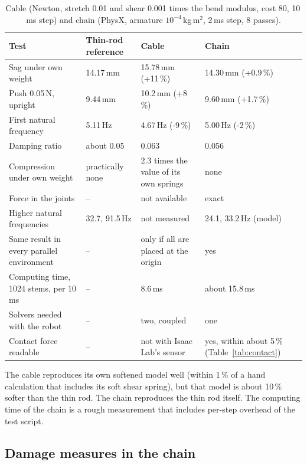 \begin{table}[h]
  \centering
  \caption{Cable (Newton, stretch 0.01 and shear 0.001 times the bend modulus, cost 80, 10\,ms step) and chain
           (PhysX, armature $10^{-4}$\,kg\,m$^2$, 2\,ms step, 8 passes).}
  \label{tab:model-comparison}
  \begin{tabular}{llll}
    \toprule
    Test & Thin-rod reference & Cable & Chain \\
    \midrule
    Sag under own weight      & 14.17\,mm   & 15.78\,mm (+11\,\%)    & 14.30\,mm (+0.9\,\%) \\
    Push 0.05\,N, upright     & 9.44\,mm    & 10.2\,mm (+8\,\%)      & 9.60\,mm (+1.7\,\%) \\
    First natural frequency   & 5.11\,Hz    & 4.67\,Hz (-9\,\%)      & 5.00\,Hz (-2\,\%) \\
    Damping ratio             & about 0.05  & 0.063                  & 0.056 \\
    Compression under own weight & practically none & 2.3 times the value of its own springs & none \\
    Force in the joints       & --          & not available          & exact \\
    Higher natural frequencies & 32.7, 91.5\,Hz & not measured        & 24.1, 33.2\,Hz (model) \\
    Same result in every parallel environment & -- & only if all are placed at the origin & yes \\
    Computing time, 1024 stems, per 10\,ms & -- & 8.6\,ms          & about 15.8\,ms \\
    Solvers needed with the robot & --      & two, coupled           & one \\
    Contact force readable    & --          & not with Isaac Lab's sensor & yes, within about 5\,\% (Table~\ref{tab:contact}) \\
    \bottomrule
  \end{tabular}
\end{table}

The cable reproduces its own softened model well (within 1\,\% of a hand calculation that includes its soft
shear spring), but that model is about 10\,\% softer than the thin rod. The chain reproduces the thin rod itself.
The computing time of the chain is a rough measurement that includes per-step overhead of the test script.

\subsection{Damage measures in the chain}

